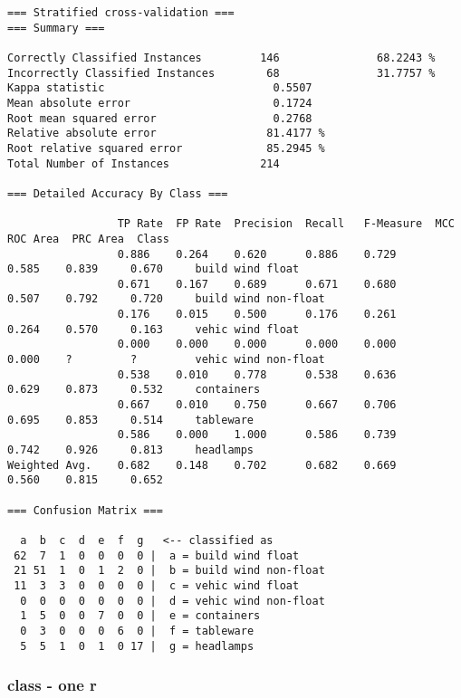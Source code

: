 \documentclass[a4paper]{article}
\begin{document}
\begin{verbatim}
=== Stratified cross-validation ===
=== Summary ===

Correctly Classified Instances         146               68.2243 %
Incorrectly Classified Instances        68               31.7757 %
Kappa statistic                          0.5507
Mean absolute error                      0.1724
Root mean squared error                  0.2768
Relative absolute error                 81.4177 %
Root relative squared error             85.2945 %
Total Number of Instances              214

=== Detailed Accuracy By Class ===

                 TP Rate  FP Rate  Precision  Recall   F-Measure  MCC      ROC Area  PRC Area  Class
                 0.886    0.264    0.620      0.886    0.729      0.585    0.839     0.670     build wind float
                 0.671    0.167    0.689      0.671    0.680      0.507    0.792     0.720     build wind non-float
                 0.176    0.015    0.500      0.176    0.261      0.264    0.570     0.163     vehic wind float
                 0.000    0.000    0.000      0.000    0.000      0.000    ?         ?         vehic wind non-float
                 0.538    0.010    0.778      0.538    0.636      0.629    0.873     0.532     containers
                 0.667    0.010    0.750      0.667    0.706      0.695    0.853     0.514     tableware
                 0.586    0.000    1.000      0.586    0.739      0.742    0.926     0.813     headlamps
Weighted Avg.    0.682    0.148    0.702      0.682    0.669      0.560    0.815     0.652

=== Confusion Matrix ===

  a  b  c  d  e  f  g   <-- classified as
 62  7  1  0  0  0  0 |  a = build wind float
 21 51  1  0  1  2  0 |  b = build wind non-float
 11  3  3  0  0  0  0 |  c = vehic wind float
  0  0  0  0  0  0  0 |  d = vehic wind non-float
  1  5  0  0  7  0  0 |  e = containers
  0  3  0  0  0  6  0 |  f = tableware
  5  5  1  0  1  0 17 |  g = headlamps

\end{verbatim}


\subsubsection{class - one r}
\end{document}
